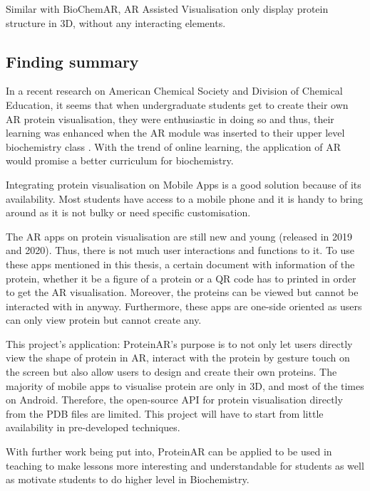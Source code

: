 Similar with BioChemAR, AR Assisted Visualisation only display protein structure in 3D, without any interacting elements. 

\subsection{Finding summary}
In a recent research on American Chemical Society and Division of Chemical Education, it seems that when undergraduate students get to create their own AR protein visualisation, they were enthusiastic in doing so and thus, their learning was enhanced when the AR module was inserted to their upper level biochemistry class \parencite{argu_fast_2020}. With the trend of online learning, the application of AR would promise a better curriculum for biochemistry.

Integrating protein visualisation on Mobile Apps is a good solution because of its availability. Most students have access to a mobile phone and it is handy  to bring around as it is not bulky or need specific customisation. 

The AR apps on protein visualisation are still new and young (released in 2019 and 2020). Thus, there is not much user interactions and functions to it. To use these apps mentioned in this thesis, a certain document with information of the protein, whether it be a figure of a protein or a QR code has to printed in order to get the AR visualisation. Moreover, the proteins can be viewed but cannot be interacted with in anyway. Furthermore, these apps are one-side oriented as users can only view protein but cannot create any. 

This project’s application: ProteinAR’s purpose is to not only let users directly view the shape of protein in AR, interact with the protein by gesture touch on the screen but also allow users to design and create their own proteins. 
The majority of mobile apps to visualise protein are only in 3D, and most of the times on Android. Therefore, the open-source API for protein visualisation directly from the PDB files are limited. This project will have to start from little availability in pre-developed techniques.

With further work being put into, ProteinAR can be applied to be used in teaching to make lessons more interesting and understandable for students as well as motivate students to do higher level in Biochemistry. 




